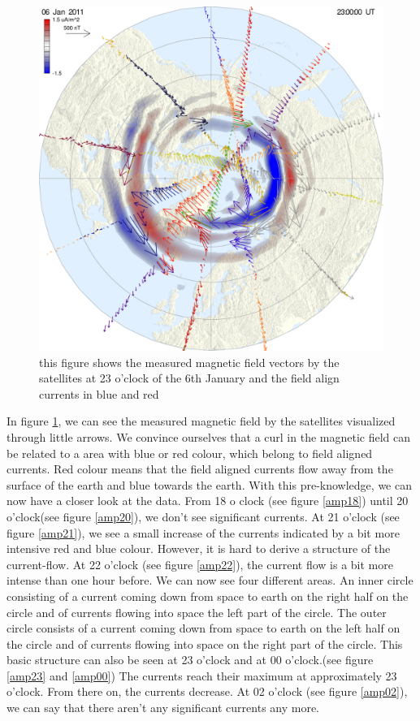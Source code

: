 \documentclass[10pt,a4paper]{article}
\begin{document}
\begin{figure}[h]
\centering
\includegraphics[scale=0.3]{summary_better_exp.pdf}
\caption{this figure shows the measured magnetic field vectors by the satellites at 23 o'clock of the 6th January and the field align currents in blue and red}
\label{AMPERE_explonation}
\end{figure}
In figure \ref{AMPERE_explonation}, we can see the measured magnetic field by the satellites visualized through little arrows. We convince ourselves that a curl in the magnetic field can be related to a area with blue or red colour, which belong to field aligned currents. Red colour means that the field aligned currents flow away from the surface of the earth and blue towards the earth. 
With this pre-knowledge, we can now have a closer look at the data. From 18 o clock (see figure \ref{amp18}) until 20 o'clock(see figure \ref{amp20}), we don't see significant currents. At 21 o'clock (see figure \ref{amp21}), we see a small increase of the currents indicated by a bit more intensive red and blue colour. However, it is hard to derive a structure of the current-flow. At 22 o'clock (see figure \ref{amp22}), the current flow is a bit more intense than one hour before. We can now see four different areas. An inner circle consisting of a current coming down from space to earth on the right half on the circle and of currents flowing into space the left part of the circle. The outer circle consists of a current coming down from space to earth on the left half on the circle and of currents flowing into space on the right part of the circle. This basic structure can also be seen at 23 o'clock and at 00 o'clock.(see figure \ref{amp23} and \ref{amp00}) 
The currents reach their maximum at approximately 23 o'clock. From there on, the currents decrease. At 02 o'clock (see figure \ref{amp02}), we can say that there aren't any significant currents any more. 
\end{document}
